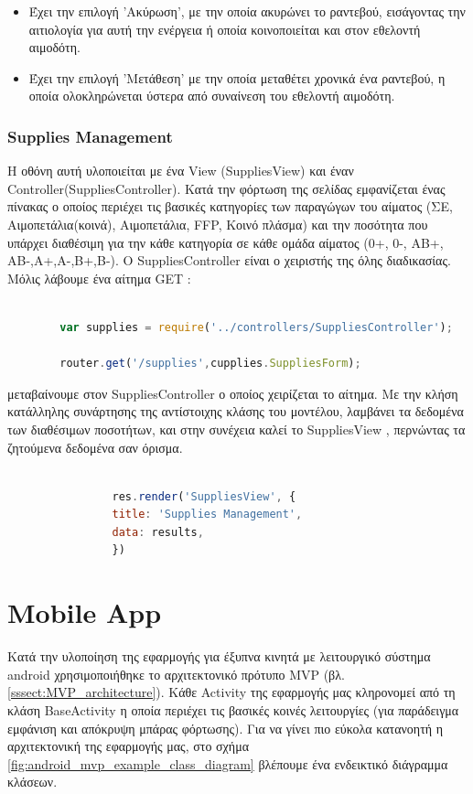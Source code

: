 		\begin{itemize}
		\item Έχει την επιλογή 'Ακύρωση', με την οποία ακυρώνει το ραντεβού, εισάγοντας την αιτιολογία για αυτή την ενέργεια ή οποία κοινοποιείται και στον εθελοντή αιμοδότη.
		
		\item Έχει την επιλογή 'Μετάθεση' με την οποία μεταθέτει χρονικά ένα ραντεβού, η οποία ολοκληρώνεται ύστερα από συναίνεση του εθελοντή αιμοδότη.		
		\end{itemize}

		

		\subsubsection{Supplies Management}
		
	Η οθόνη αυτή υλοποιείται με ένα View (SuppliesView) και έναν Controller(SuppliesController). Κατά την φόρτωση της σελίδας εμφανίζεται ένας πίνακας ο οποίος περιέχει τις βασικές κατηγορίες των παραγώγων του αίματος (ΣΕ, Αιμοπετάλια(κοινά), Αιμοπετάλια, FFP, Κοινό πλάσμα) και την ποσότητα που υπάρχει διαθέσιμη για την κάθε κατηγορία σε κάθε ομάδα αίματος (0+, 0-, ΑΒ+, ΑΒ-,Α+,Α-,Β+,Β-). O SuppliesController είναι ο χειριστής της όλης διαδικασίας. Μόλις λάβουμε ένα αίτημα GET :
		
		\begin{lstlisting}[language=Javascript]			
		
		var supplies = require('../controllers/SuppliesController');
		
		router.get('/supplies',cupplies.SuppliesForm);  


		\end{lstlisting}
		
μεταβαίνουμε στον SuppliesController ο οποίος χειρίζεται το αίτημα. Με την κλήση κατάλληλης συνάρτησης της αντίστοιχης κλάσης του μοντέλου, λαμβάνει τα δεδομένα των διαθέσιμων ποσοτήτων,  και στην συνέχεια καλεί το SuppliesView , περνώντας τα ζητούμενα δεδομένα σαν όρισμα.



		\begin{lstlisting}[language=Javascript]			
		
	            res.render('SuppliesView', { 
                title: 'Supplies Management',
                data: results,
				})

		\end{lstlisting}
	

\section{Mobile App}
	Κατά την υλοποίηση της εφαρμογής για έξυπνα κινητά με λειτουργικό σύστημα android χρησιμοποιήθηκε το αρχιτεκτονικό πρότυπο MVP (βλ. \ref{sssect:MVP_architecture}). Κάθε Activity της εφαρμογής μας κληρονομεί από τη κλάση BaseActivity η οποία περιέχει τις βασικές κοινές λειτουργίες (για παράδειγμα εμφάνιση και απόκρυψη μπάρας φόρτωσης). Για να γίνει πιο εύκολα κατανοητή η αρχιτεκτονική της εφαρμογής μας, στο σχήμα \ref{fig:android_mvp_example_class_diagram} βλέπουμε ένα ενδεικτικό διάγραμμα κλάσεων.
	
